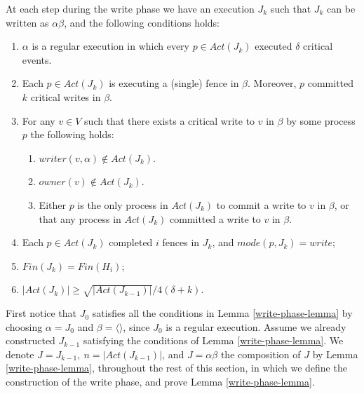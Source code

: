 \begin{lemma} \label{write-phase-lemma}
	At each step during the write phase we have an execution $J_k$ such that $J_k$ can be written as $\alpha \beta$, and the following conditions holds:
	\begin{enumerate}[(1)]
		\item $\alpha$ is a regular execution in which every $p \in Act(J_k)$ executed $\delta$ critical events.
		\item Each $p \in Act(J_k)$ is executing a (single) fence in $\beta$. Moreover, $p$ committed $k$ critical writes in $\beta$.
		\item For any $v \in V$ such that there exists a critical write to $v$ in $\beta$ by some process $p$ the following holds:
		\begin{enumerate}
			\item $writer(v,\alpha) \notin Act(J_k)$.
			\item $owner(v) \notin Act(J_k)$.
			\item Either $p$ is the only process in $Act(J_k)$ to commit a write to $v$ in $\beta$, or that any process in $Act(J_k)$ committed a write to $v$ in $\beta$.
		\end{enumerate}
		\item Each $p\in Act(J_k)$ completed $i$ fences in $J_k$, and $mode(p, J_k) = write$;
		\item $Fin(J_k) = Fin(H_i)$;
		\item $|Act(J_k)| \geq \sqrt{|Act(J_{k-1})|}/4(\delta+k)$.
	\end{enumerate}
\end{lemma}

First notice that $J_0$ satisfies all the conditions in Lemma \ref{write-phase-lemma} by choosing $\alpha = J_0$ and $\beta = \langle \rangle$, since $J_0$ is a regular execution. Assume we already constructed $J_{k-1}$ satisfying the conditions of Lemma \ref{write-phase-lemma}. We denote $J=J_{k-1},\ n=|Act(J_{k-1})|$, and $J = \alpha \beta$ the composition of $J$ by Lemma \ref{write-phase-lemma}, throughout the rest of this section, in which we define the construction of the write phase, and prove Lemma \ref{write-phase-lemma}.

